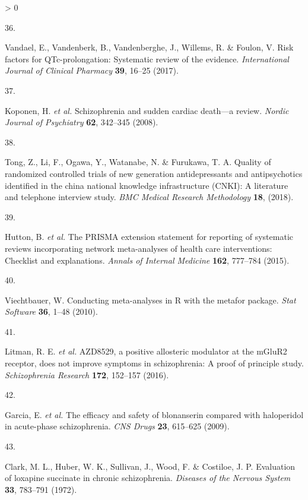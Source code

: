 \documentclass[
  9pt,
  english,
  ,jou,floatsintext]{apa6}
\newlength{\cslhangindent}
\newlength{\csllabelwidth}
\newenvironment{CSLReferences}[2] %
 {%
  \setlength{\parindent}{0pt}
  \ifodd #1 \everypar{\setlength{\hangindent}{\cslhangindent}}\ignorespaces\fi
  \ifnum #2 > 0
  \setlength{\parskip}{#2\baselineskip}
  \fi
 }%
 {}
\newcommand{\CSLLeftMargin}[1]{\parbox[t]{\csllabelwidth}{#1}}
\newcommand{\CSLRightInline}[1]{\parbox[t]{\linewidth - \csllabelwidth}{#1}\break}
\begin{document}
\begin{CSLReferences}{0}{0}
\leavevmode\hypertarget{ref-Vandael2017}{}%
\CSLLeftMargin{36. }
\CSLRightInline{Vandael, E., Vandenberk, B., Vandenberghe, J., Willems, R. \& Foulon, V. Risk factors for QTc-prolongation: Systematic review of the evidence. \emph{{International Journal of Clinical Pharmacy}} \textbf{39}, 16--25 (2017).}

\leavevmode\hypertarget{ref-Koponen2008}{}%
\CSLLeftMargin{37. }
\CSLRightInline{Koponen, H. \emph{et al.} Schizophrenia and sudden cardiac death---a review. \emph{{Nordic Journal of Psychiatry}} \textbf{62}, 342--345 (2008).}

\leavevmode\hypertarget{ref-Tong2018}{}%
\CSLLeftMargin{38. }
\CSLRightInline{Tong, Z., Li, F., Ogawa, Y., Watanabe, N. \& Furukawa, T. A. Quality of randomized controlled trials of new generation antidepressants and antipsychotics identified in the china national knowledge infrastructure (CNKI): A literature and telephone interview study. \emph{BMC Medical Research Methodology} \textbf{18}, (2018).}

\leavevmode\hypertarget{ref-Hutton2015}{}%
\CSLLeftMargin{39. }
\CSLRightInline{Hutton, B. \emph{et al.} The {PRISMA} extension statement for reporting of systematic reviews incorporating network meta-analyses of health care interventions: Checklist and explanations. \emph{Annals of Internal Medicine} \textbf{162}, 777--784 (2015).}

\leavevmode\hypertarget{ref-Viechtbauer2010}{}%
\CSLLeftMargin{40. }
\CSLRightInline{Viechtbauer, W. Conducting meta-analyses in {R} with the {metafor} package. \emph{Stat Software} \textbf{36}, 1--48 (2010).}

\leavevmode\hypertarget{ref-Litman2016}{}%
\CSLLeftMargin{41. }
\CSLRightInline{Litman, R. E. \emph{et al.} {AZD8529}, a positive allosteric modulator at the {mGluR2} receptor, does not improve symptoms in schizophrenia: {A} proof of principle study. \emph{Schizophrenia Research} \textbf{172}, 152--157 (2016).}

\leavevmode\hypertarget{ref-Garcia2009}{}%
\CSLLeftMargin{42. }
\CSLRightInline{Garcia, E. \emph{et al.} The efficacy and safety of blonanserin compared with haloperidol in acute-phase schizophrenia. \emph{CNS Drugs} \textbf{23}, 615--625 (2009).}

\leavevmode\hypertarget{ref-Clark1972}{}%
\CSLLeftMargin{43. }
\CSLRightInline{Clark, M. L., Huber, W. K., Sullivan, J., Wood, F. \& Costiloe, J. P. Evaluation of loxapine succinate in chronic schizophrenia. \emph{Diseases of the Nervous System} \textbf{33}, 783--791 (1972).}


\end{CSLReferences}
\end{document}

